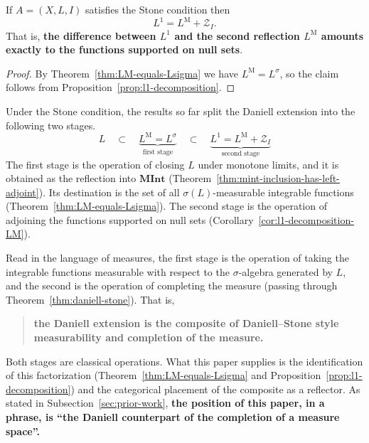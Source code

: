 \begin{corollary}\label{cor:l1-decomposition-LM}
  If $A=(X,L,I)$ satisfies the Stone condition then
  \[
    L^1=L^{\mathrm{M}}+\mathcal{Z}_I .
  \]
  That is, \textbf{the difference between $L^1$ and the second reflection
  $L^{\mathrm{M}}$ amounts exactly to the functions supported on null sets}.
\end{corollary}
\begin{proof}
  By Theorem~\ref{thm:LM-equals-Lsigma} we have
  $L^{\mathrm{M}}=L^{\sigma}$, so the claim follows from
  Proposition~\ref{prop:l1-decomposition}.
\end{proof}

\begin{remark}\label{rem:D-factors}
  Under the Stone condition, the results so far split the Daniell extension into
  the following two stages.
  \[
    L
    \quad\subset\quad
    \underbrace{L^{\mathrm{M}}=L^{\sigma}}_{\text{first stage}}
    \quad\subset\quad
    \underbrace{L^1=L^{\mathrm{M}}+\mathcal{Z}_I}_{\text{second stage}}
  \]
  The first stage is the operation of closing $L$ under monotone limits, and it
  is obtained as the reflection into $\mathbf{MInt}$
  (Theorem~\ref{thm:mint-inclusion-has-left-adjoint}).
  Its destination is the set of all $\sigma(L)$-measurable integrable functions
  (Theorem~\ref{thm:LM-equals-Lsigma}).
  The second stage is the operation of adjoining the functions supported on null
  sets (Corollary~\ref{cor:l1-decomposition-LM}).

  Read in the language of measures, the first stage is the operation of taking
  the integrable functions measurable with respect to the $\sigma$-algebra
  generated by $L$, and the second is the operation of completing the measure
  (passing through Theorem~\ref{thm:daniell-stone}).
  That is,
  \begin{quote}
    \textbf{the Daniell extension is the composite of Daniell--Stone style
    measurability and completion of the measure.}
  \end{quote}

  \noindent
  Both stages are classical operations.
  What this paper supplies is the identification of this factorization
  (Theorem~\ref{thm:LM-equals-Lsigma} and
  Proposition~\ref{prop:l1-decomposition}) and the categorical placement of the
  composite as a reflector.
  As stated in Subsection~\ref{sec:prior-work},
  \textbf{the position of this paper, in a phrase, is ``the Daniell counterpart
  of the completion of a measure space''.}
\end{remark}


